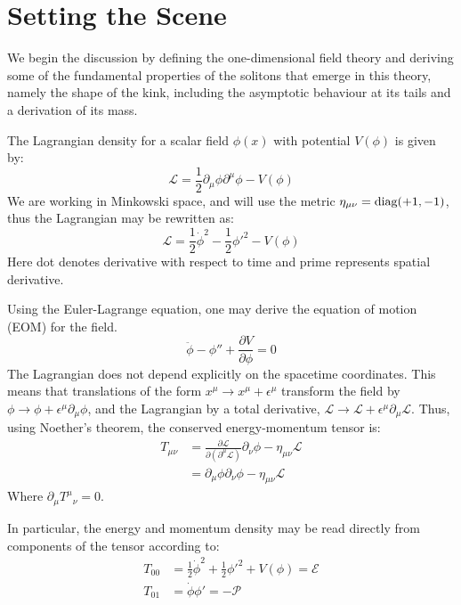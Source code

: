 \documentclass[11pt, oneside]{article}  	%
\numberwithin{equation}{section}
\begin{document}
\section{Setting the Scene} \label{set_scene}
We begin the discussion by defining the  one-dimensional field theory and deriving some of the fundamental properties of the solitons that emerge in this theory, namely the shape of the kink, including the asymptotic behaviour at its tails and a derivation of its mass.\par
The Lagrangian density for a scalar field $\phi(x)$ with potential $V(\phi)$ is given by:
\begin{equation}\label{lagrangian}
\mathcal{L} = \frac{1}{2} \partial_\mu \phi \partial^\mu \phi  - V(\phi)
\end{equation} 
We are working in Minkowski space, and will use the metric $\eta_{\mu\nu} = \textup{diag}(+1,-1)$, thus the Lagrangian may be rewritten as:
\begin{equation}
\mathcal{L} = \frac{1}{2}\dot{\phi}^2 -  \frac{1}{2}{\phi'}^2   - V(\phi)
\end{equation}
Here dot denotes derivative with respect to time and prime represents spatial derivative.\par
Using the Euler-Lagrange equation, one may derive the equation of motion (EOM) for the field.
\begin{equation}\label{EOM}
\ddot{\phi} - {\phi}'' + \frac{\partial V}{\partial \phi} = 0
\end{equation}
The Lagrangian does not depend explicitly on the spacetime coordinates. This means that translations of the form $x^\mu \rightarrow x^\mu + \epsilon ^\mu$ transform the field by $\phi \rightarrow \phi + \epsilon^\mu \partial_\mu \phi$, and the Lagrangian by a total derivative, $\mathcal{L}\rightarrow \mathcal{L} + \epsilon^\mu \partial_\mu \mathcal{L}$. Thus, using Noether's theorem, the conserved energy-momentum tensor is:
\begin{align}
T_{\mu \nu} &= \frac{\partial \mathcal{L}}{\partial \left (\partial^\mu \mathcal{L}\right )} \partial_\nu\phi - \eta_{\mu\nu} \mathcal{L}  \nonumber \\
&=  \partial_\mu\phi \partial_\nu\phi - \eta_{\mu\nu} \mathcal{L}  
\end{align}
Where $\partial_{\mu}{T^{\mu}}_{\nu} = 0$.\par
In particular, the energy and momentum density may be read directly from components of the tensor according to:
 \begin{align}
T_{00} &= \frac{1}{2}\dot{\phi}^2 +  \frac{1}{2}{\phi'}^2   +V(\phi) = \mathcal{E} \label{energy}\\
T_{01} &= \dot{\phi} \phi'  = -\mathcal{P} \label{momentum}
\end{align}\par
\end{document}

